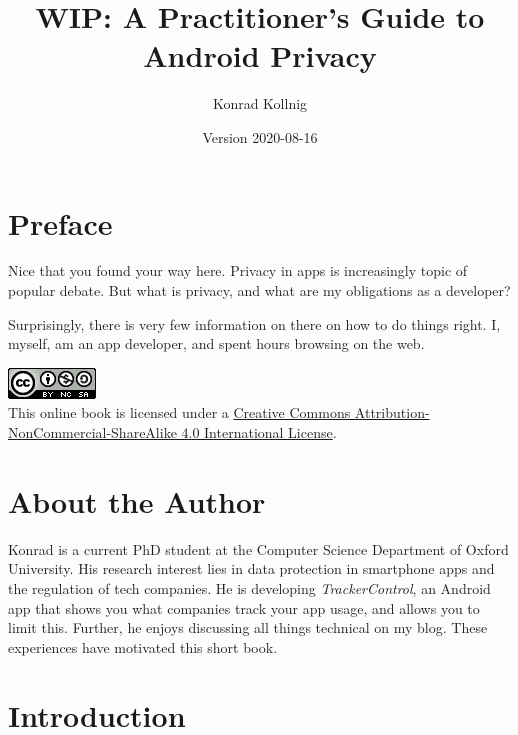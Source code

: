 \documentclass[
]{book}
\title{WIP: A Practitioner's Guide to Android Privacy}
\author{Konrad Kollnig}
\date{Version 2020-08-16}
\begin{document}
\maketitle

{
\setcounter{tocdepth}{1}
\tableofcontents
}
\hypertarget{preface}{%
\chapter*{Preface}\label{preface}}

Nice that you found your way here. Privacy in apps is increasingly topic of popular debate. But what is privacy, and what are my obligations as a developer?

Surprisingly, there is very few information on there on how to do things right. I, myself, am an app developer, and spent hours browsing on the web.

\includegraphics{images/by-nc-sa.png}\\
This online book is licensed under a \href{http://creativecommons.org/licenses/by-nc-sa/4.0/}{Creative Commons Attribution-NonCommercial-ShareAlike 4.0 International License}.

\hypertarget{about-the-author}{%
\chapter*{About the Author}\label{about-the-author}}

Konrad is a current PhD student at the Computer Science Department of Oxford University. His research interest lies in data protection in smartphone apps and the regulation of tech companies. He is developing \emph{TrackerControl}, an Android app that shows you what companies track your app usage, and allows you to limit this.
Further, he enjoys discussing all things technical on my blog. These experiences have motivated this short book.

\hypertarget{intro}{%
\chapter{Introduction}\label{intro}}
\end{document}
